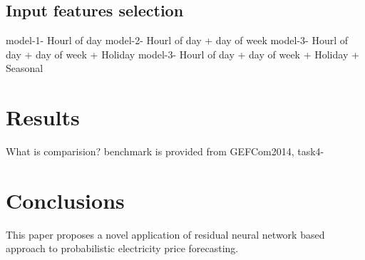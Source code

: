 \documentclass[review]{elsarticle}
\begin{document}
  \subsection{Input features selection}
    model-1- Hourl of day
    model-2- Hourl of day + day of week
    model-3- Hourl of day + day of week + Holiday
    model-3- Hourl of day + day of week + Holiday + Seasonal



\section{Results}
What is comparision? benchmark is provided from GEFCom2014, task4-\cite{Dudek2016}



\section{Conclusions}
This paper proposes a novel application of residual neural network based approach to probabilistic electricity price forecasting.
\end{document}
